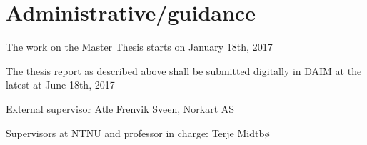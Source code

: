 

\section*{Administrative/guidance}
The work on the Master Thesis starts on January 18th, 2017

The thesis report as described above shall be submitted digitally in DAIM at the latest at June 18th, 2017

External supervisor
Atle Frenvik Sveen, Norkart AS

Supervisors at NTNU and professor in charge:
Terje Midtbø
